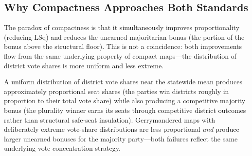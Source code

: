 \subsection{Why Compactness Approaches Both Standards}

The paradox of compactness is that it simultaneously improves proportionality
(reducing $\text{LSq}$) and reduces the unearned majoritarian bonus (the portion
of the bonus above the structural floor). This is not a coincidence: both
improvements flow from the same underlying property of compact maps---the
distribution of district vote shares is more uniform and less extreme.

A uniform distribution of district vote shares near the statewide mean produces
approximately proportional seat shares (the parties win districts roughly in
proportion to their total vote share) while also producing a competitive majority
bonus (the plurality winner earns its seats through competitive district outcomes
rather than structural safe-seat insulation). Gerrymandered maps with deliberately
extreme vote-share distributions are less proportional \textit{and} produce larger
unearned bonuses for the majority party---both failures reflect the same underlying
vote-concentration strategy.
